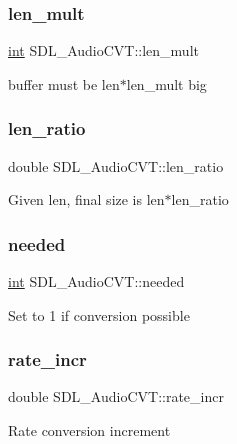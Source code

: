 \subsubsection{\texorpdfstring{len\_mult}{len\_mult}}
{\footnotesize\ttfamily \mbox{\hyperlink{warnings_8h_a74f207b5aa4ba51c3a2ad59b219a423b}{int}} S\+D\+L\+\_\+\+Audio\+C\+V\+T\+::len\+\_\+mult}

buffer must be len$\ast$len\+\_\+mult big \mbox{\label{struct_s_d_l___audio_c_v_t_a5628ff5ccf711de9d77c0a4a9f57d2f0}} 
\subsubsection{\texorpdfstring{len\_ratio}{len\_ratio}}
{\footnotesize\ttfamily double S\+D\+L\+\_\+\+Audio\+C\+V\+T\+::len\+\_\+ratio}

Given len, final size is len$\ast$len\+\_\+ratio \mbox{\label{struct_s_d_l___audio_c_v_t_ac600a035a48df05e14d3712fd6953ad4}} 
\subsubsection{\texorpdfstring{needed}{needed}}
{\footnotesize\ttfamily \mbox{\hyperlink{warnings_8h_a74f207b5aa4ba51c3a2ad59b219a423b}{int}} S\+D\+L\+\_\+\+Audio\+C\+V\+T\+::needed}

Set to 1 if conversion possible \mbox{\label{struct_s_d_l___audio_c_v_t_ad886122c23a6673073baace31bff3b6c}} 
\subsubsection{\texorpdfstring{rate\_incr}{rate\_incr}}
{\footnotesize\ttfamily double S\+D\+L\+\_\+\+Audio\+C\+V\+T\+::rate\+\_\+incr}

Rate conversion increment \mbox{\label{struct_s_d_l___audio_c_v_t_a6ae81231e017105e6d5e745a51732e16}} 
